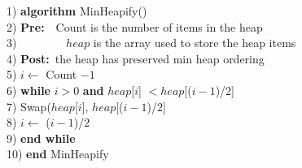 \begin{tabbing}
1)  \textbf{alg}\= \textbf{orithm} MinHeapify() \\
2)  \> \textbf{Pre:}~~Count is the number of items in the heap \\
3)  \> ~~~~~~~~$heap$ is the array used to store the heap items \\
4)  \> \textbf{Post:}~the heap has preserved min heap ordering \\
5)  \> $i \leftarrow$ Count $- 1$ \\
6)  \> \textbf{whi}\= \textbf{le} $i >0$ \textbf{and} $heap$[$i$] $< heap$[($i - 1$)/$2$] \\
7)  \> \> Swap($heap$[$i$], $heap$[($i - 1$)/$2$] \\
8)  \> \> $i \leftarrow$ ($i - 1$)/$2$ \\
9)  \> \textbf{end while} \\
10) \textbf{end} MinHeapify \\
\end{tabbing}

